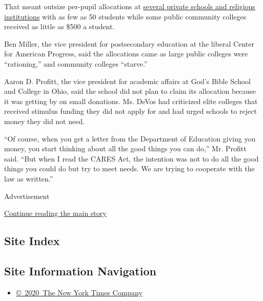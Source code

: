 That meant outsize per-pupil allocations at
\href{https://www2.ed.gov/about/offices/list/ope/allocationsfipse.pdf}{several
private schools and religious institutions} with as few as 50 students
while some public community colleges received as little as \$500 a
student.

Ben Miller, the vice president for postsecondary education at the
liberal Center for American Progress, said the allocations came as large
public colleges were ``rationing,'' and community colleges ``starve.''

Aaron D. Profitt, the vice president for academic affairs at God's Bible
School and College in Ohio, said the school did not plan to claim its
allocation because it was getting by on small donations. Ms. DeVos had
criticized elite colleges that received stimulus funding they did not
apply for and had urged schools to reject money they did not need.

``Of course, when you get a letter from the Department of Education
giving you money, you start thinking about all the good things you can
do,'' Mr. Profitt said. ``But when I read the CARES Act, the intention
was not to do all the good things you could do but try to meet needs. We
are trying to cooperate with the law as written.''

Advertisement

\protect\hyperlink{after-bottom}{Continue reading the main story}

\hypertarget{site-index}{%
\subsection{Site Index}\label{site-index}}

\hypertarget{site-information-navigation}{%
\subsection{Site Information
Navigation}\label{site-information-navigation}}

\begin{itemize}
\tightlist
\item
  \href{https://help.nytimes.com/hc/en-us/articles/115014792127-Copyright-notice}{©~2020~The
  New York Times Company}
\end{itemize}

